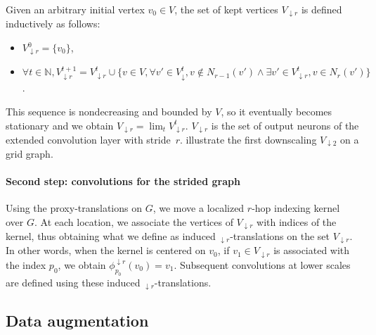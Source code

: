 Given an arbitrary initial vertex $v_0 \in V$, the set of kept vertices $V_{\downarrow r}$ is defined inductively as follows:
\begin{itemize}[noitemsep,nolistsep]
\item $V_{\downarrow r}^0 = \{v_0\}$,
\item $\forall t \in \mathbb{N}, V_{\downarrow r}^{t+1} = V_{\downarrow r}^t \cup \{v \in V, \forall v' \in V_{\downarrow }^t, v \not\in N_{r-1}(v') \land \exists v' \in V_{\downarrow r}^t, v \in N_{r}(v') \}$.
\end{itemize}
This sequence is nondecreasing and bounded by $V$, so it eventually becomes stationary and we obtain $V_{\downarrow r} = \lim_t{V_{\downarrow r}^t}$. $V_{\downarrow r}$ is the set of output neurons of the extended convolution layer with stride~$r$.  illustrate the first downscaling $V_{\downarrow 2}$ on a grid graph. %

\paragraph{Second step: convolutions for the strided graph}

Using the proxy-translations on $G$, we move a localized $r$-hop indexing kernel over $G$. At each location, we associate the vertices of $V_{\downarrow r}$ with indices of the kernel, thus obtaining what we define as induced $_{\downarrow r}$-translations on the set $V_{\downarrow r}$. In other words, when the kernel is centered on $v_0$, if $v_1 \in V_{\downarrow r}$ is associated with the index $p_0$, we obtain $\phi_{p_0}^{\downarrow r}(v_0) = v_1$. Subsequent convolutions at lower scales are defined using these induced $_{\downarrow r}$-translations.




\subsection{Data augmentation}


